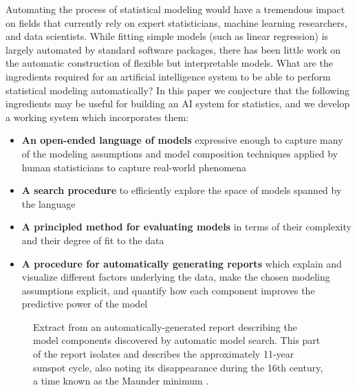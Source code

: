 








Automating the process of statistical modeling would have a tremendous impact on fields that currently rely on expert statisticians, machine learning researchers, and data scientists.
While fitting simple models (such as linear regression) is largely automated by standard software packages, there has been little work on the automatic construction of flexible but interpretable models. 
What are the ingredients required for an artificial intelligence system to be able to perform statistical modeling automatically? 
In this paper we conjecture that the following ingredients may be useful for building an AI system for statistics, and we develop a working system which incorporates them:
\begin{itemize}
\item {\bf An open-ended language of models} expressive enough to
  capture many of the modeling assumptions and model composition
  techniques  applied by human statisticians to capture real-world phenomena
\item {\bf A search procedure} to efficiently explore the space of
  models spanned by the language
\item {\bf A principled method for evaluating models} in terms of their complexity and their degree of fit to the
  data
\item {\bf A procedure for automatically generating reports} which
  explain and visualize different factors underlying the data, make
  the chosen modeling assumptions explicit, and quantify how each
  component improves the predictive power of the model 
\end{itemize}

\begin{figure}[t]
\centering
{}
\caption[Extract from an automatically-generated report]
{Extract from an automatically-generated report describing the model components discovered by automatic model search.  This part of the report isolates and describes the approximately 11-year sunspot cycle, also noting its disappearance during the 16th century, a time known as the Maunder minimum \citep{lean1995reconstruction}.}
\label{fig:periodic}
\end{figure}

